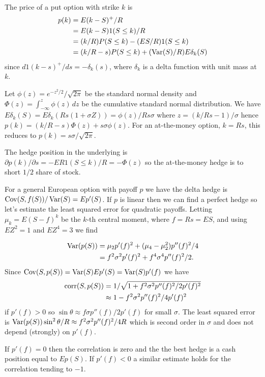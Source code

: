\documentclass[fleqn]{amsart}
\newcommand{\Var}{\mathop{\rm{Var}}}
\newcommand{\Cov}{\mathop{\rm{Cov}}}
\newcommand{\corr}{\mathop{\rm{corr}}}
\begin{document}
The price of a put option with strike \(k\) is 
\begin{align*}
p(k) &= E(k - S)^+/R\\
&= E(k - S)1(S \le k)/R\\
&= (k/R) P(S\le k) - (ES/R)1(S\le k)\\
&= (k/R - s)P(S\le k) + (\Var(S)/R) E\delta_k(S)
\end{align*}
since \(d1(k - s)^+/ds = -\delta_k(s)\), where \(\delta_k\) is a 
delta function with unit mass at \(k\).

Let \(\phi(z) = e^{-z^2/2}/\sqrt{2\pi}\) be
the standard normal density and \(\Phi(z) = \int_{-\infty}^z \phi(z)\,dz\)
be the cumulative standard normal distribution.
We have \(E\delta_k(S) = E\delta_k(Rs(1 + \sigma Z)) = \phi(z)/Rs\sigma\)
where \(z = (k/Rs - 1)/\sigma\) hence
\(p(k) = (k/R - s)\Phi(z) + s\sigma\phi(z)\).
For an at-the-money option, \(k = Rs\), this reduces to
\(p(k) = s\sigma/\sqrt{2\pi}\).

The hedge position in the underlying is 
\(\partial p(k)/\partial s = -ER1(S\le k)/R = -\Phi(z)\) so
the at-the-money hedge is to short \(1/2\) share of stock.

For a general European option with payoff \(p\) we have the delta
hedge is \(\Cov(S,f(S))/\Var(S) = Ep'(S)\). If \(p\) is linear
then we can find a perfect hedge so let's estimate the least
squared error for quadratic payoffs. Letting \(\mu_k
= E(S - f)^k\) be the \(k\)-th central moment, where \(f = Rs = ES\),
and using \(EZ^2 = 1\) and \(EZ^4 = 3\) we find

\begin{align*}
\Var(p(S)) &= \mu_2 p'(f)^2 + (\mu_4 - \mu_2^2)p''(f)^2/4\\
&= f^2\sigma^2 p'(f)^2 + f^4\sigma^4 p''(f)^2/2.\\
\end{align*}
Since \(\Cov(S,p(S)) = \Var(S)Ep'(S) = \Var(S)p'(f)\) we have
\begin{align*}
\corr(S,p(S)) &= 1/\sqrt{1 + f^2\sigma^2 p''(f)^2/2p'(f)^2}\\
&\approx 1 - f^2\sigma^2 p''(f)^2/4p'(f)^2\\
\end{align*}
if \(p'(f) > 0\)
so \(\sin\theta \approx f\sigma p''(f)/2p'(f)\) 
for small \(\sigma\). The least squared error is
\(\Var(p(S))\sin^2\theta/R \approx f^2\sigma^2p''(f)^2/4R\)
which is second order in \(\sigma\) and does not depend (strongly)
on \(p'(f)\).

If \(p'(f) = 0\) then the correlation is zero and the the best
hedge is a cash position equal to \(Ep(S)\). If \(p'(f) < 0\)
a similar estimate holds for the correlation tending to \(-1\).
\end{document}
